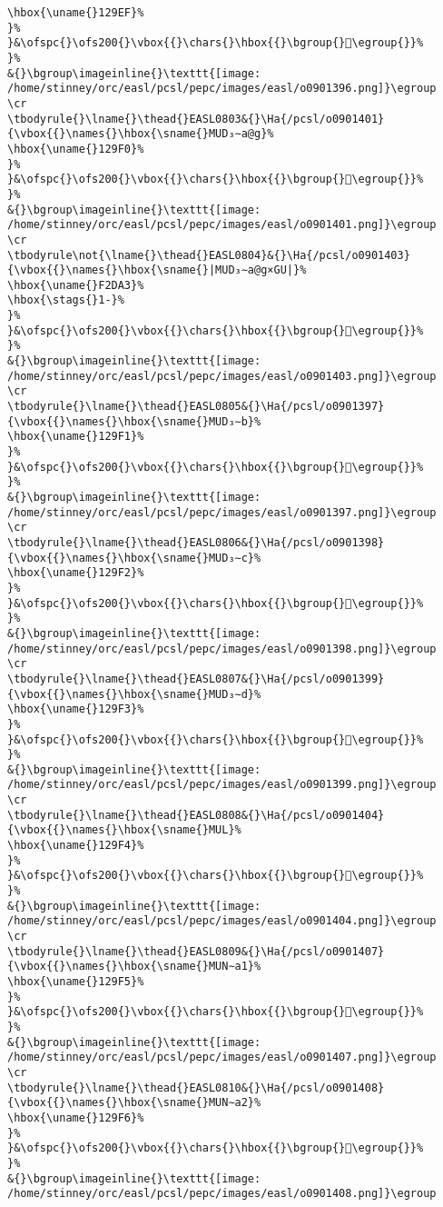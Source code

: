 \begin{verbatim}
\hbox{\uname{}129EF}%
}%
}&\ofspc{}\ofs200{}\vbox{{}\chars{}\hbox{{}\bgroup{}𒧯\egroup{}}%
}%
&{}\bgroup\imageinline{}\texttt{[image: /home/stinney/orc/easl/pcsl/pepc/images/easl/o0901396.png]}\egroup
\cr
\tbodyrule{}\lname{}\thead{}EASL0803&{}\Ha{/pcsl/o0901401}{\vbox{{}\names{}\hbox{\sname{}MUD₃∼a@g}%
\hbox{\uname{}129F0}%
}%
}&\ofspc{}\ofs200{}\vbox{{}\chars{}\hbox{{}\bgroup{}𒧰\egroup{}}%
}%
&{}\bgroup\imageinline{}\texttt{[image: /home/stinney/orc/easl/pcsl/pepc/images/easl/o0901401.png]}\egroup
\cr
\tbodyrule\not{\lname{}\thead{}EASL0804}&{}\Ha{/pcsl/o0901403}{\vbox{{}\names{}\hbox{\sname{}|MUD₃∼a@g×GU|}%
\hbox{\uname{}F2DA3}%
\hbox{\stags{}1-}%
}%
}&\ofspc{}\ofs200{}\vbox{{}\chars{}\hbox{{}\bgroup{}󲶣\egroup{}}%
}%
&{}\bgroup\imageinline{}\texttt{[image: /home/stinney/orc/easl/pcsl/pepc/images/easl/o0901403.png]}\egroup
\cr
\tbodyrule{}\lname{}\thead{}EASL0805&{}\Ha{/pcsl/o0901397}{\vbox{{}\names{}\hbox{\sname{}MUD₃∼b}%
\hbox{\uname{}129F1}%
}%
}&\ofspc{}\ofs200{}\vbox{{}\chars{}\hbox{{}\bgroup{}𒧱\egroup{}}%
}%
&{}\bgroup\imageinline{}\texttt{[image: /home/stinney/orc/easl/pcsl/pepc/images/easl/o0901397.png]}\egroup
\cr
\tbodyrule{}\lname{}\thead{}EASL0806&{}\Ha{/pcsl/o0901398}{\vbox{{}\names{}\hbox{\sname{}MUD₃∼c}%
\hbox{\uname{}129F2}%
}%
}&\ofspc{}\ofs200{}\vbox{{}\chars{}\hbox{{}\bgroup{}𒧲\egroup{}}%
}%
&{}\bgroup\imageinline{}\texttt{[image: /home/stinney/orc/easl/pcsl/pepc/images/easl/o0901398.png]}\egroup
\cr
\tbodyrule{}\lname{}\thead{}EASL0807&{}\Ha{/pcsl/o0901399}{\vbox{{}\names{}\hbox{\sname{}MUD₃∼d}%
\hbox{\uname{}129F3}%
}%
}&\ofspc{}\ofs200{}\vbox{{}\chars{}\hbox{{}\bgroup{}𒧳\egroup{}}%
}%
&{}\bgroup\imageinline{}\texttt{[image: /home/stinney/orc/easl/pcsl/pepc/images/easl/o0901399.png]}\egroup
\cr
\tbodyrule{}\lname{}\thead{}EASL0808&{}\Ha{/pcsl/o0901404}{\vbox{{}\names{}\hbox{\sname{}MUL}%
\hbox{\uname{}129F4}%
}%
}&\ofspc{}\ofs200{}\vbox{{}\chars{}\hbox{{}\bgroup{}𒧴\egroup{}}%
}%
&{}\bgroup\imageinline{}\texttt{[image: /home/stinney/orc/easl/pcsl/pepc/images/easl/o0901404.png]}\egroup
\cr
\tbodyrule{}\lname{}\thead{}EASL0809&{}\Ha{/pcsl/o0901407}{\vbox{{}\names{}\hbox{\sname{}MUN∼a1}%
\hbox{\uname{}129F5}%
}%
}&\ofspc{}\ofs200{}\vbox{{}\chars{}\hbox{{}\bgroup{}𒧵\egroup{}}%
}%
&{}\bgroup\imageinline{}\texttt{[image: /home/stinney/orc/easl/pcsl/pepc/images/easl/o0901407.png]}\egroup
\cr
\tbodyrule{}\lname{}\thead{}EASL0810&{}\Ha{/pcsl/o0901408}{\vbox{{}\names{}\hbox{\sname{}MUN∼a2}%
\hbox{\uname{}129F6}%
}%
}&\ofspc{}\ofs200{}\vbox{{}\chars{}\hbox{{}\bgroup{}𒧶\egroup{}}%
}%
&{}\bgroup\imageinline{}\texttt{[image: /home/stinney/orc/easl/pcsl/pepc/images/easl/o0901408.png]}\egroup

\end{verbatim}
